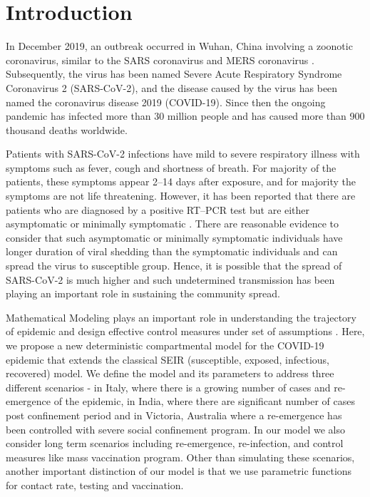 \documentclass[authoryear,preprint]{elsarticle}
\begin{document}
	
\section{Introduction}
\label{SEC1}
In December 2019, an outbreak occurred in Wuhan, China involving a zoonotic coronavirus, similar to the SARS coronavirus and MERS coronavirus  \cite{taaa021}. Subsequently, the virus has been named Severe Acute Respiratory Syndrome Coronavirus 2 (SARS-CoV-2), and the disease caused by the virus has been named the coronavirus disease 2019 (COVID-19). Since then the ongoing pandemic has infected more than 30 million people and has caused more than 900 thousand deaths worldwide.

Patients with SARS-CoV-2 infections have mild to severe respiratory illness with symptoms such as fever, cough and shortness of breath. For majority of the patients, these symptoms appear 2–14 days after exposure, and for majority the symptoms are not life threatening. However, it has been reported that there are patients who are diagnosed by a positive RT–PCR test but are either asymptomatic or minimally symptomatic \cite{pmid32146694,pmid32179137,pmid32083643,Kenji2020,Long2020}. There are reasonable evidence to consider that such asymptomatic or minimally symptomatic individuals have longer duration of viral shedding than the symptomatic individuals and can spread the virus to susceptible group\cite{Long2020}.  Hence, it is possible that the spread of SARS-CoV-2 is much higher and such undetermined transmission has been playing an important role in sustaining the community spread. 

Mathematical Modeling plays an important role in understanding the trajectory of epidemic and design effective control measures under set of assumptions \cite{539a5e40c4cf4e6a8dc8035b3930c45d,doi:10.1098/rspb.2004.2800,Giordano2020}. Here, we propose a new deterministic compartmental model for the COVID-19 epidemic that extends the classical SEIR (susceptible, exposed, infectious, recovered) model. We define the model and its parameters to address three different scenarios - in Italy, where there is a growing number of cases and re-emergence of the epidemic, in India, where there are significant number of cases post confinement period and in Victoria, Australia where a re-emergence has been controlled with severe social confinement program. In our model we also consider long term scenarios including re-emergence, re-infection, and control measures like mass vaccination program. Other than simulating these scenarios, another important distinction of our model is that we use parametric functions for contact rate, testing and vaccination.
\end{document}
